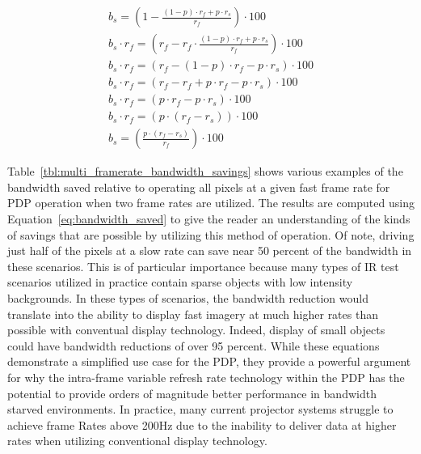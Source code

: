     \begin{equation}
        \begin{array}{ l }
            \displaystyle b_s=\left(1-\frac{(1-p)\cdot r_f + p\cdot r_s}{r_f}\right)\cdot 100 \\[16pt]
            \displaystyle b_s \cdot r_f=\left(r_f-r_f \cdot \frac{(1-p)\cdot r_f + p\cdot r_s}{r_f}\right)\cdot 100 \\[13pt]
            \displaystyle b_s \cdot r_f= (r_f - (1-p)\cdot r_f - p\cdot r_s)\cdot 100 \\[13pt]
            \displaystyle b_s \cdot r_f= (r_f - r_f + p \cdot r_f - p\cdot r_s)\cdot 100 \\[13pt]
            \displaystyle b_s \cdot r_f= (p \cdot r_f - p\cdot r_s)\cdot 100 \\[13pt]
            \displaystyle b_s \cdot r_f= (p \cdot (r_f - r_s))\cdot 100 \\[13pt]
            \displaystyle b_s=\left(\frac{p \cdot (r_f-r_s)}{r_f}\right)\cdot 100
        \end{array}
        \label{eq:bandwidth_saved}
    \end{equation}

    Table~\ref{tbl:multi_framerate_bandwidth_savings} shows various examples of the bandwidth saved relative to operating all pixels at a given fast frame rate for PDP operation when two frame rates are utilized. The results are computed using Equation~\eqref{eq:bandwidth_saved} to give the reader an understanding of the kinds of savings that are possible by utilizing this method of operation. Of note, driving just half of the pixels at a slow rate can save near 50 percent of the bandwidth in these scenarios. This is of particular importance because many types of IR test scenarios utilized in practice contain sparse objects with low intensity backgrounds. In these types of scenarios, the bandwidth reduction would translate into the ability to display fast imagery at much higher rates than possible with conventual display technology. Indeed, display of small objects could have bandwidth reductions of over 95 percent. While these equations demonstrate a simplified use case for the PDP, they provide a powerful argument for why the intra-frame variable refresh rate technology within the PDP has the potential to provide orders of magnitude better performance in bandwidth starved environments. In practice, many current projector systems struggle to achieve frame Rates above 200Hz due to the inability to deliver data at higher rates when utilizing conventional display technology.

